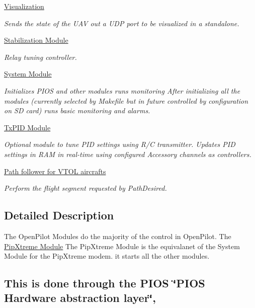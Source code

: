 \begin{DoxyCompactItemize}
\hyperlink{group___visualization}{Visualization}
\begin{DoxyCompactList}\small\item\em Sends the state of the U\-A\-V out a U\-D\-P port to be visualized in a standalone. \end{DoxyCompactList}\item 
\hyperlink{group___stabilization_module}{Stabilization Module}
\begin{DoxyCompactList}\small\item\em Relay tuning controller. \end{DoxyCompactList}\item 
\hyperlink{group___system_module}{System Module}
\begin{DoxyCompactList}\small\item\em Initializes P\-I\-O\-S and other modules runs monitoring After initializing all the modules (currently selected by Makefile but in future controlled by configuration on S\-D card) runs basic monitoring and alarms. \end{DoxyCompactList}\item 
\hyperlink{group___tx_p_i_d_module}{Tx\-P\-I\-D Module}
\begin{DoxyCompactList}\small\item\em Optional module to tune P\-I\-D settings using R/\-C transmitter. Updates P\-I\-D settings in R\-A\-M in real-\/time using configured Accessory channels as controllers. \end{DoxyCompactList}\item 
\hyperlink{group___vtol_path_follower}{Path follower for V\-T\-O\-L aircrafts}
\begin{DoxyCompactList}\small\item\em Perform the flight segment requested by Path\-Desired. \end{DoxyCompactList}\end{DoxyCompactItemize}


\subsection{Detailed Description}
The Open\-Pilot Modules do the majority of the control in Open\-Pilot. The \hyperlink{group___pip_xtreme_module}{Pip\-Xtreme Module} The Pip\-Xtreme Module is the equivalanet of the System Module for the Pip\-Xtreme modem. it starts all the other modules. \subsection*{This is done through the  P\-I\-O\-S \char`\"{}\-P\-I\-O\-S Hardware abstraction layer\char`\"{},}

